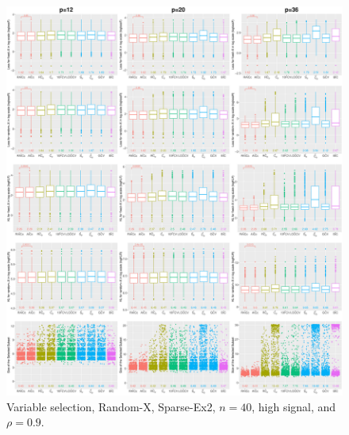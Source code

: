 \begin{figure}[!ht]
\centering
\includegraphics[width=\textwidth]{figures/supplement/randomx/subset_selection/Sparse-Ex2_n40_hsnr_rho09.eps}
\caption{Variable selection, Random-X, Sparse-Ex2, $n=40$, high signal, and $\rho=0.9$.}
\end{figure}
\clearpage
